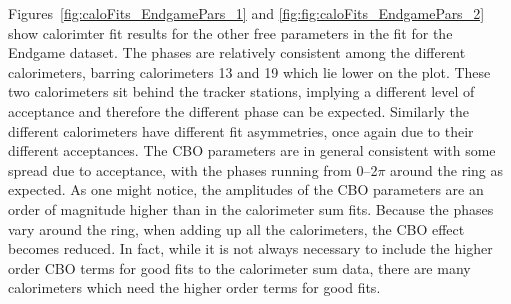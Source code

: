 Figures~\ref{fig:caloFits_EndgamePars_1} and \ref{fig:fig:caloFits_EndgamePars_2} show calorimter fit results for the other free parameters in the fit for the Endgame dataset. The \gmtwo phases are relatively consistent among the different calorimeters, barring calorimeters 13 and 19 which lie lower on the plot. These two calorimeters sit behind the tracker stations, implying a different level of acceptance and therefore the different \gmtwo phase can be expected. Similarly the different calorimeters have different fit asymmetries, once again due to their different acceptances. The CBO parameters are in general consistent with some spread due to acceptance, with the phases running from 0--2$\pi$ around the ring as expected. As one might notice, the amplitudes of the CBO parameters are an order of magnitude higher than in the calorimeter sum fits. Because the phases vary around the ring, when adding up all the calorimeters, the CBO effect becomes reduced. In fact, while it is not always necessary to include the higher order CBO terms for good fits to the calorimeter sum data, there are many calorimeters which need the higher order terms for good fits.


